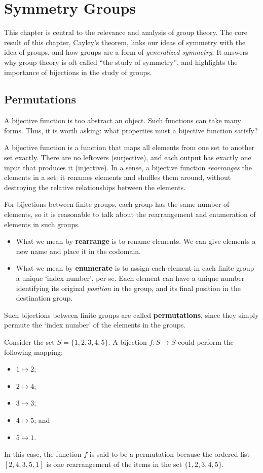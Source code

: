 \chapter{Symmetry Groups}
This chapter is central to the relevance and analysis of group theory. The core result of this chapter, Cayley's theorem, links our ideas of symmetry with the idea of groups, and how groups are a form of \textit{generalized symmetry}. It answers why group theory is oft called ``the study of symmetry'', and highlights the importance of bijections in the study of groups.

\section{Permutations}
A bijective function is too abstract an object. Such functions can take many forms. Thus, it is worth asking: what properties must a bijective function satisfy?

A bijective function is a function that maps all elements from one set to another set exactly. There are no leftovers (surjective), and each output has exactly one input that produces it (injective). In a sense, a bijective function \textit{rearranges} the elements in a set; it renames elements and shuffles them around, without destroying the relative relationships between the elements.

For bijections between finite groups, each group has the same number of elements, so it is reasonable to talk about the rearrangement and enumeration of elements in such groups.
\begin{itemize}
    \item What we mean by \textbf{rearrange} is to rename elements. We can give elements a new name and place it in the codomain.
    \item What we mean by \textbf{enumerate} is to assign each element in each finite group a unique `index number', per se. Each element can have a unique number identifying its original \textit{position} in the group, and its final position in the destination group.
\end{itemize}

Such bijections between finite groups are called \textbf{permutations}, since they simply permute the `index number' of the elements in the groups.

\begin{example}
    Consider the set $S = \{1, 2, 3, 4, 5\}$. A bijection $f: S \to S$ could perform the following mapping:
    \begin{itemize}
        \item $1 \mapsto 2$;
        \item $2 \mapsto 4$;
        \item $3 \mapsto 3$;
        \item $4 \mapsto 5$; and
        \item $5 \mapsto 1$.
    \end{itemize}
    In this case, the function $f$ is said to be a permutation because the ordered list $[2, 4, 3, 5, 1]$ is one rearrangement of the items in the set $\{1, 2, 3, 4, 5\}$.
\end{example}

